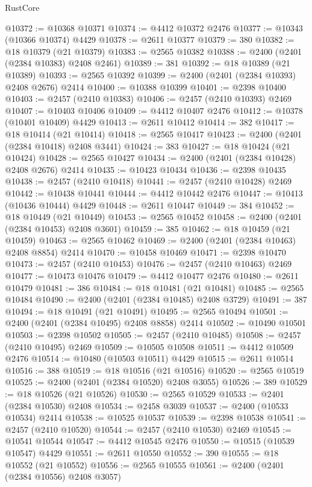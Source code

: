 \begin{lexlean}{RustCore}
\begin{coremodule}
@10372 := @10368 @10371
@10374 := @4412 @10372 @2476
@10377 := @10343 (@10366 @10374) @4429
@10378 := @2611 @10377
@10379 := 380
@10382 := @18 @10379 (@21 @10379)
@10383 := @2565 @10382
@10388 := @2400 (@2401 (@2384 @10383) @2408 @2461)
@10389 := 381
@10392 := @18 @10389 (@21 @10389)
@10393 := @2565 @10392
@10399 := @2400 (@2401 (@2384 @10393) @2408 @2676) @2414
@10400 := @10388 @10399
@10401 := @2398 @10400
@10403 := @2457 (@2410 @10383)
@10406 := @2457 (@2410 @10393) @2469
@10407 := @10403 @10406
@10409 := @4412 @10407 @2476
@10412 := @10378 (@10401 @10409) @4429
@10413 := @2611 @10412
@10414 := 382
@10417 := @18 @10414 (@21 @10414)
@10418 := @2565 @10417
@10423 := @2400 (@2401 (@2384 @10418) @2408 @3441)
@10424 := 383
@10427 := @18 @10424 (@21 @10424)
@10428 := @2565 @10427
@10434 := @2400 (@2401 (@2384 @10428) @2408 @2676) @2414
@10435 := @10423 @10434
@10436 := @2398 @10435
@10438 := @2457 (@2410 @10418)
@10441 := @2457 (@2410 @10428) @2469
@10442 := @10438 @10441
@10444 := @4412 @10442 @2476
@10447 := @10413 (@10436 @10444) @4429
@10448 := @2611 @10447
@10449 := 384
@10452 := @18 @10449 (@21 @10449)
@10453 := @2565 @10452
@10458 := @2400 (@2401 (@2384 @10453) @2408 @3601)
@10459 := 385
@10462 := @18 @10459 (@21 @10459)
@10463 := @2565 @10462
@10469 := @2400 (@2401 (@2384 @10463) @2408 @8854) @2414
@10470 := @10458 @10469
@10471 := @2398 @10470
@10473 := @2457 (@2410 @10453)
@10476 := @2457 (@2410 @10463) @2469
@10477 := @10473 @10476
@10479 := @4412 @10477 @2476
@10480 := @2611 @10479
@10481 := 386
@10484 := @18 @10481 (@21 @10481)
@10485 := @2565 @10484
@10490 := @2400 (@2401 (@2384 @10485) @2408 @3729)
@10491 := 387
@10494 := @18 @10491 (@21 @10491)
@10495 := @2565 @10494
@10501 := @2400 (@2401 (@2384 @10495) @2408 @8858) @2414
@10502 := @10490 @10501
@10503 := @2398 @10502
@10505 := @2457 (@2410 @10485)
@10508 := @2457 (@2410 @10495) @2469
@10509 := @10505 @10508
@10511 := @4412 @10509 @2476
@10514 := @10480 (@10503 @10511) @4429
@10515 := @2611 @10514
@10516 := 388
@10519 := @18 @10516 (@21 @10516)
@10520 := @2565 @10519
@10525 := @2400 (@2401 (@2384 @10520) @2408 @3055)
@10526 := 389
@10529 := @18 @10526 (@21 @10526)
@10530 := @2565 @10529
@10533 := @2401 (@2384 @10530) @2408
@10534 := @2458 @3039
@10537 := @2400 (@10533 @10534) @2414
@10538 := @10525 @10537
@10539 := @2398 @10538
@10541 := @2457 (@2410 @10520)
@10544 := @2457 (@2410 @10530) @2469
@10545 := @10541 @10544
@10547 := @4412 @10545 @2476
@10550 := @10515 (@10539 @10547) @4429
@10551 := @2611 @10550
@10552 := 390
@10555 := @18 @10552 (@21 @10552)
@10556 := @2565 @10555
@10561 := @2400 (@2401 (@2384 @10556) @2408 @3057)

\end{coremodule}
\end{lexlean}
